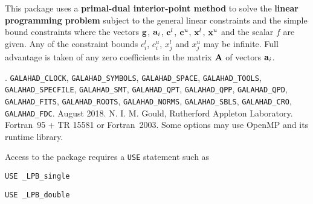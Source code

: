 \documentclass{galahad}
\newcommand{\packagename}{LPB}
\newcommand{\fullpackagename}{\libraryname\_\packagename}
\begin{document}
\galheader


\galsummary
This package uses a {\bf primal-dual interior-point method}
to solve the {\bf linear programming problem}
subject to the general linear constraints
and the simple bound constraints
where the vectors ${\mathbf{g}}$, ${\mathbf{a}}_{i}$, ${\mathbf{c}}^{l}$, ${\mathbf{c}}^{u}$, ${\mathbf{x}}^{l}$,
${\mathbf{x}}^{u}$ and the scalar $f$ are given.
Any of the constraint bounds $c_{i}^{l}$, $c_{i}^{u}$,
$x_{j}^{l}$ and $x_{j}^{u}$ may be infinite.
Full advantage is taken of any zero coefficients in
the matrix ${\mathbf{A}}$ of vectors ${\mathbf{a}}_{i}$.


\galattributes
\galversions{\tt  \fullpackagename\_single, \fullpackagename\_double}.
\galuses
{\tt GALAHAD\_CLOCK},
{\tt GALAHAD\_SY\-M\-BOLS},
{\tt GALAHAD\-\_SPACE},
{\tt GALAHAD\_TOOLS},
{\tt GALAHAD\_SPECFILE},
{\tt GALAHAD\_SMT},
{\tt GALAHAD\_QPT},
{\tt GALAHAD\_QPP},
{\tt GALAHAD\_\-QPD},
{\tt GALAHAD\_\-FITS},
{\tt GALAHAD\_\-ROOTS},
{\tt GALAHAD\_\-NORMS},
{\tt GALAHAD\_\-SBLS},
{\tt GALAHAD\_\-CRO},
{\tt GALAHAD\_FDC}.
\galdate August 2018.
\galorigin N. I. M. Gould, Rutherford Appleton Laboratory.
\gallanguage Fortran~95 + TR 15581 or Fortran~2003.
\galparallelism Some options may use OpenMP and its runtime library.


\galhowto


Access to the package requires a {\tt USE} statement such as

\medskip{}

\hspace{8mm} {\tt USE \fullpackagename\_single}

\medskip{}

\hspace{8mm} {\tt USE  \fullpackagename\_double}
\end{document}
